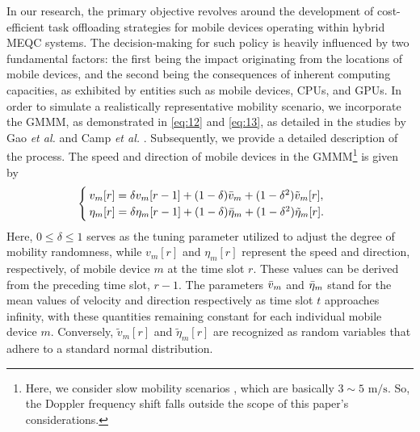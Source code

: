 \documentclass[journal]{IEEEtran}
\begin{document}
In our research, the primary objective revolves around the development of cost-efficient task offloading strategies for mobile devices operating within hybrid MEQC systems. The decision-making for such policy is heavily influenced by two fundamental factors: the first being the impact originating from the locations of mobile devices, and the second being the consequences of inherent computing capacities, as exhibited by entities such as mobile devices, CPUs, and GPUs.
In order to simulate a realistically representative mobility scenario, we incorporate the GMMM, as demonstrated in \eqref{eq:12} and \eqref{eq:13}, as detailed in the studies by Gao {\em et al.} \cite{gao2019dynamicsocial} and Camp {\em et al.} \cite{camp2002survey}.
Subsequently, we provide a detailed description of the process.
The speed and direction of mobile devices in the GMMM{\footnote{Here, we consider slow mobility scenarios \cite{gao2019dynamicsocial,camp2002survey}, which are basically $3\sim 5\text{~m}/\text{s}$. So, the Doppler frequency shift falls outside the scope of this paper's considerations.}} is given by
\begin{align}\label{eq:12}
\hspace{-0.5em}\begin{cases}
        v_m[r]=\delta v_m[r-1]+(1-\delta)\Bar{v}_m+(1-\delta^2)\tilde{v}_m[r],\\
        \eta_m[r]=\delta \eta_m[r-1]+(1-\delta)\Bar{\eta}_m+(1-\delta^2)\tilde{\eta}_m[r].
    \end{cases}
\end{align}
Here, $0 \le \delta \le 1$ serves as the tuning parameter utilized to adjust the degree of mobility randomness, while $v_m[r]$ and $\eta_m[r]$ represent the speed and direction, respectively, of mobile device $m$ at the time slot $r$.
These values can be derived from the preceding time slot, $r-1$.
The parameters $\Bar{v}_m$ and $\Bar{\eta}_m$ stand for the mean values of velocity and direction respectively as time slot $t$ approaches infinity, with these quantities remaining constant for each individual mobile device $m$.
Conversely, $\tilde{v}_m[r]$ and $\tilde{\eta}_m[r]$ are recognized as random variables that adhere to a standard normal distribution.
\end{document}
